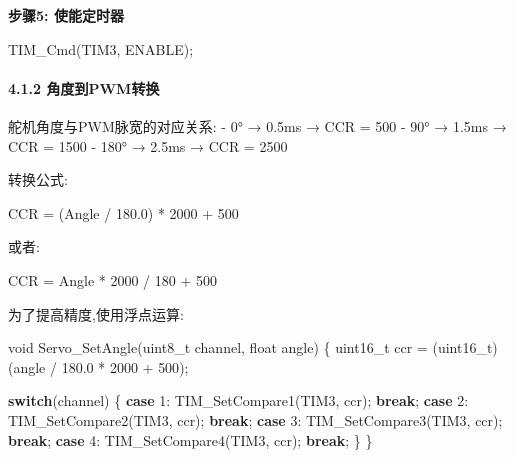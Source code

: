 \documentclass[
]{article}
\newenvironment{Shaded}{}{}
\newcommand{\ControlFlowTok}[1]{\textcolor[rgb]{0.00,0.44,0.13}{\textbf{#1}}}
\newcommand{\DataTypeTok}[1]{\textcolor[rgb]{0.56,0.13,0.00}{#1}}
\newcommand{\DecValTok}[1]{\textcolor[rgb]{0.25,0.63,0.44}{#1}}
\newcommand{\FloatTok}[1]{\textcolor[rgb]{0.25,0.63,0.44}{#1}}
\newcommand{\NormalTok}[1]{#1}
\begin{document}
\textbf{步骤5: 使能定时器}

\begin{Shaded}
\begin{Highlighting}[]
\NormalTok{TIM\_Cmd(TIM3, ENABLE);}
\end{Highlighting}
\end{Shaded}

\hypertarget{ux89d2ux5ea6ux5230pwmux8f6cux6362}{%
\paragraph{4.1.2
角度到PWM转换}\label{ux89d2ux5ea6ux5230pwmux8f6cux6362}}

舵机角度与PWM脉宽的对应关系: - 0° → 0.5ms → CCR = 500 - 90° → 1.5ms →
CCR = 1500 - 180° → 2.5ms → CCR = 2500

转换公式:

\begin{Shaded}
\begin{Highlighting}[]
\NormalTok{CCR = (Angle / }\FloatTok{180.0}\NormalTok{) * }\DecValTok{2000}\NormalTok{ + }\DecValTok{500}
\end{Highlighting}
\end{Shaded}

或者:

\begin{Shaded}
\begin{Highlighting}[]
\NormalTok{CCR = Angle * }\DecValTok{2000}\NormalTok{ / }\DecValTok{180}\NormalTok{ + }\DecValTok{500}
\end{Highlighting}
\end{Shaded}

为了提高精度,使用浮点运算:

\begin{Shaded}
\begin{Highlighting}[]
\DataTypeTok{void}\NormalTok{ Servo\_SetAngle(}\DataTypeTok{uint8\_t}\NormalTok{ channel, }\DataTypeTok{float}\NormalTok{ angle)}
\NormalTok{\{}
    \DataTypeTok{uint16\_t}\NormalTok{ ccr = (}\DataTypeTok{uint16\_t}\NormalTok{)(angle / }\FloatTok{180.0}\NormalTok{ * }\DecValTok{2000}\NormalTok{ + }\DecValTok{500}\NormalTok{);}
    
    \ControlFlowTok{switch}\NormalTok{(channel) \{}
        \ControlFlowTok{case} \DecValTok{1}\NormalTok{: TIM\_SetCompare1(TIM3, ccr); }\ControlFlowTok{break}\NormalTok{;}
        \ControlFlowTok{case} \DecValTok{2}\NormalTok{: TIM\_SetCompare2(TIM3, ccr); }\ControlFlowTok{break}\NormalTok{;}
        \ControlFlowTok{case} \DecValTok{3}\NormalTok{: TIM\_SetCompare3(TIM3, ccr); }\ControlFlowTok{break}\NormalTok{;}
        \ControlFlowTok{case} \DecValTok{4}\NormalTok{: TIM\_SetCompare4(TIM3, ccr); }\ControlFlowTok{break}\NormalTok{;}
\NormalTok{    \}}
\NormalTok{\}}
\end{Highlighting}
\end{Shaded}
\end{document}
